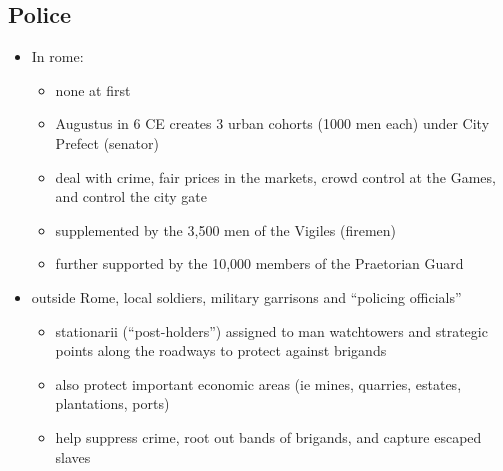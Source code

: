 \documentclass[12pt, twoside]{article}
\begin{document}
\subsection{Police}
\begin{itemize}
\item In rome:
	\begin{itemize}
	\item none at first
	\item Augustus in 6 CE creates 3 urban cohorts (1000 men each) under City Prefect (senator)
	\item deal with crime, fair prices in the markets, crowd control at the Games, and control the city gate
	\item supplemented by the 3,500 men of the Vigiles (firemen)
	\item further supported by the 10,000 members of the Praetorian Guard
	\end{itemize}
\item outside Rome, local soldiers, military garrisons and “policing officials” 
	\begin{itemize}
	\item stationarii (“post-holders”) assigned to man watchtowers and strategic points along the roadways to protect against brigands
	\item also protect important economic areas (ie mines, quarries, estates, plantations, ports)
	\item help suppress crime, root out bands of brigands, and capture escaped slaves
	\end{itemize}
\end{itemize}
\end{document}
